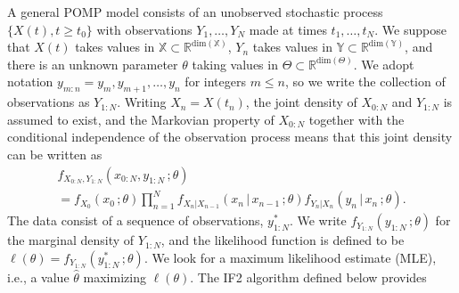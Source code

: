 \documentclass{pnastwo}\usepackage[]{graphicx}\usepackage[]{color}
\newcommand\given{{\, | \,}}
\newcommand\giventh{\,;}
\def\R{\mathbb{R}}
\newcommand\lik{\ell}
\newcommand\Xspace{{\mathbb X}}
\newcommand\Yspace{{\mathbb Y}}
\newcommand\Thetaspace{{\bbTheta}}
\newcommand\Xdim{{\mathrm{dim}}(\Xspace)}
\newcommand\Ydim{{\mathrm{dim}}(\Yspace)}
\newcommand\Thetadim{{\mathrm{dim}}(\Thetaspace)}
\newcommand{\bbTheta}{\Theta}
\begin{document}
\begin{article}
A general POMP model consists of an unobserved stochastic process $\{X(t),t\ge t_0\}$ with observations $Y_{1},\dots,Y_N$ made at times $t_1,\dots,t_N$. 
  We suppose that $X(t)$ takes values in $\Xspace\subset \R^{\Xdim}$, $Y_n$ takes values in $\Yspace\subset \R^{\Ydim}$, and there is an unknown parameter $\theta$ taking values in $\Thetaspace\subset\R^{\Thetadim}$.
We adopt notation $y_{m:n}=y_m,y_{m+1},\dots,y_n$ for integers $m\le n$, so we write the collection of observations as $Y_{1:N}$.
Writing $X_n=X(t_n)$, the joint density of $X_{0:N}$ and $Y_{1:N}$ is assumed to exist, and the Markovian property of $X_{0:N}$ together with the conditional independence of the observation process means that this joint density can be written as
\begin{equation}\nonumber
\begin{array}{l}
f_{X_{0:N},Y_{1:N}}(x_{0:N},y_{1:N}\giventh\theta)\\
 = f_{X_0}(x_0\giventh\theta){\displaystyle \prod_{n=1}^N} 
f_{X_n|X_{n-1}}(x_n\given x_{n-1}\giventh\theta)f_{Y_n|X_{n}}(y_n\given x_{n}\giventh\theta).
\end{array}
\end{equation}
The data consist of a sequence of observations, $y^*_{1:N}$.
We write $f_{Y_{1:N}}(y_{1:N}\giventh\theta)$ for the marginal density of $Y_{1:N}$, and the likelihood function is defined to be $\lik(\theta)=f_{Y_{1:N}}(y^*_{1:N}\giventh\theta)$.
We look for a maximum likelihood estimate (MLE), i.e., a value $\hat\theta$ maximizing $\lik(\theta)$.
The IF2 algorithm defined below provides 

\newpage

\vspace{-1mm}


\end{article}
\end{document}
